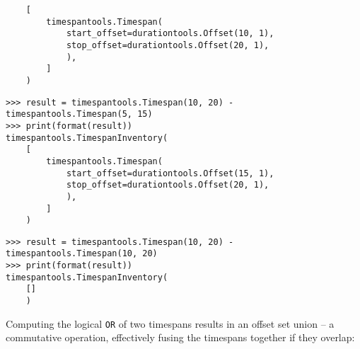 \begin{abjadbookoutput}
\begin{singlespacing}
\begin{lstlisting}
    [
        timespantools.Timespan(
            start_offset=durationtools.Offset(10, 1),
            stop_offset=durationtools.Offset(20, 1),
            ),
        ]
    )
\end{lstlisting}
\begin{lstlisting}
>>> result = timespantools.Timespan(10, 20) - timespantools.Timespan(5, 15)
>>> print(format(result))
timespantools.TimespanInventory(
    [
        timespantools.Timespan(
            start_offset=durationtools.Offset(15, 1),
            stop_offset=durationtools.Offset(20, 1),
            ),
        ]
    )
\end{lstlisting}
\begin{lstlisting}
>>> result = timespantools.Timespan(10, 20) - timespantools.Timespan(10, 20)
>>> print(format(result))
timespantools.TimespanInventory(
    []
    )
\end{lstlisting}
\end{singlespacing}
\end{abjadbookoutput}

\noindent Computing the logical \texttt{OR} of two timespans results in an
offset set union -- a commutative operation, effectively fusing the timespans
together if they overlap:

\begin{comment}
<abjad>
result = timespantools.Timespan(0, 10) | timespantools.Timespan(5, 15)
print(format(result))
result = timespantools.Timespan(0, 10) | timespantools.Timespan(10, 20)
print(format(result))
result = timespantools.Timespan(5, 15) | timespantools.Timespan(10, 20)
print(format(result))
</abjad>
\end{comment}

